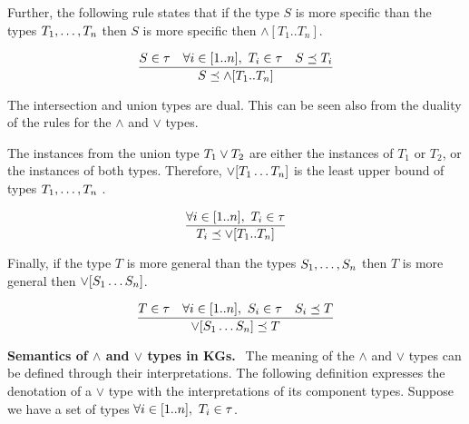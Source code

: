\documentclass[runningheads]{llncs}
\newcommand{\memo}[1]{}
\begin{document}
Further, the following rule states that if the type $S$ is more
specific than the types $T_1,\ldots\/,T_n$ then $S$ is more specific
then $\land[T_1..T_n]$.

\memo{\begin{equation}
\dfrac{S,T_1,T_2\in\tau\quad S\preceq\/T_1\quad\/S\preceq\/\/T_2}
      {S\preceq\/T_1\land\/T_2}  
\end{equation}}

\begin{equation}
\label{rul:intsc-gather}
\dfrac{S\in\tau\quad\forall\/i\in[1..n],\ T_i\in\tau\quad\/S\preceq\/T_i}
      {S\preceq\land[T_1..\/T_n]}  
\end{equation} 

The intersection and union types are dual. This can be seen also from
the duality of the rules for the $\land$ and $\lor$ types.

The instances from the union type $T_1\lor\/T_2$ are either the
instances of $T_1$ or $T_2$, or the instances of both
types. Therefore, $\lor[T_1\ldots\/T_n]$ is the least upper bound of
types $T_1,\ldots,\/T_n$ \cite{Pierce1991}.

\memo{\begin{equation}
\dfrac{T_1,T_2\in\tau}
      {T_1\preceq\/T_1\lor\/T_2}
\end{equation}

\begin{equation}
\dfrac{T_1,T_2\in\tau}
      {T_2\preceq\/T_1\lor\/T_2}
\end{equation}}

\begin{equation}
\label{rul:lor-1}
\dfrac{\forall\/i\in[1..n],\ T_i\in\tau}
      {T_i\preceq\/\lor[T_1..\/T_n]}
\end{equation}

Finally, if the type $T$ is more general than the types
$S_1,\ldots,\/S_n$ then $T$ is more general then
$\lor[S_1\ldots\/S_n]$.

\memo{\begin{equation}
\dfrac{T,S_1,S_2\in\tau\quad S_1\preceq\/T\quad\/S_2\preceq\/\/T}
      {S_1\lor\/S_2\preceq\/T}  
\end{equation}}

\begin{equation}
\label{rul:lor-2}
\dfrac{T\in\tau\quad\forall\/i\in[1..n],\ S_i\in\tau\quad\/S_i\preceq\/T}
      {\lor[S_1\ldots\/S_n]\preceq\/T}  
\end{equation}


\medskip\noindent
\textbf{Semantics of $\land$ and $\lor$ types in KGs.$\ \ $}
The meaning of the $\land$ and $\lor$ types can be defined through
their interpretations. The following definition expresses the
denotation of a $\lor$ type with the interpretations of its component
types. Suppose we have a set of types
$\forall\/i\in\/[1..n],\ T_i\in\tau$.
\end{document}
